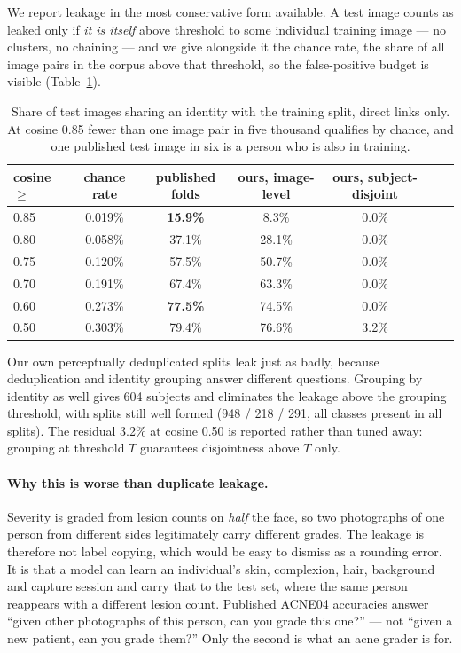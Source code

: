 \documentclass[11pt]{article}
\begin{document}
We report leakage in the most conservative form available. A test image counts as leaked
only if \emph{it is itself} above threshold to some individual training image --- no
clusters, no chaining --- and we give alongside it the chance rate, the share of all
image pairs in the corpus above that threshold, so the false-positive budget is visible
(Table~\ref{tab:subject}).

\begin{table}[t]
\centering
\begin{tabular}{lcccccc}
\toprule
cosine $\geq$ & chance rate & published folds & ours, image-level & ours, subject-disjoint \\
\midrule
0.85 & 0.019\% & \textbf{15.9\%} & 8.3\% & 0.0\% \\
0.80 & 0.058\% & 37.1\% & 28.1\% & 0.0\% \\
0.75 & 0.120\% & 57.5\% & 50.7\% & 0.0\% \\
0.70 & 0.191\% & 67.4\% & 63.3\% & 0.0\% \\
0.60 & 0.273\% & \textbf{77.5\%} & 74.5\% & 0.0\% \\
0.50 & 0.303\% & 79.4\% & 76.6\% & 3.2\% \\
\bottomrule
\end{tabular}
\caption{Share of test images sharing an identity with the training split, direct links
only. At cosine 0.85 fewer than one image pair in five thousand qualifies by chance, and
one published test image in six is a person who is also in training.}
\label{tab:subject}
\end{table}

Our own perceptually deduplicated splits leak just as badly, because deduplication and
identity grouping answer different questions. Grouping by identity as well gives 604
subjects and eliminates the leakage above the grouping threshold, with splits still
well formed (948 / 218 / 291, all classes present in all splits). The residual 3.2\% at
cosine 0.50 is reported rather than tuned away: grouping at threshold $T$ guarantees
disjointness above $T$ only.

\paragraph{Why this is worse than duplicate leakage.}
Severity is graded from lesion counts on \emph{half} the face, so two photographs of one
person from different sides legitimately carry different grades. The leakage is
therefore not label copying, which would be easy to dismiss as a rounding error. It is
that a model can learn an individual's skin, complexion, hair, background and capture
session and carry that to the test set, where the same person reappears with a different
lesion count. Published ACNE04 accuracies answer ``given other photographs of this
person, can you grade this one?'' --- not ``given a new patient, can you grade them?''
Only the second is what an acne grader is for.
\end{document}
